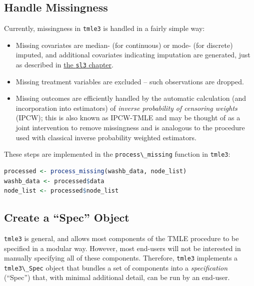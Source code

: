 \documentclass[
  12pt, krantz2,
]{book}
\newcommand{\passthrough}[1]{#1}
\providecommand{\tightlist}{%
  \setlength{\itemsep}{0pt}\setlength{\parskip}{0pt}}
\theoremstyle{definition}
\theoremstyle{definition}
\theoremstyle{definition}
\newcommand{\1}{\mathbbm{1}}
\begin{document}
\hypertarget{handle-missingness}{%
\subsection{Handle Missingness}\label{handle-missingness}}

Currently, missingness in \passthrough{\lstinline!tmle3!} is handled in a fairly simple way:

\begin{itemize}
\tightlist
\item
  Missing covariates are median- (for continuous) or mode- (for discrete)
  imputed, and additional covariates indicating imputation are generated, just
  as described in \protect\hyperlink{sl3}{the \passthrough{\lstinline!sl3!} chapter}.
\item
  Missing treatment variables are excluded -- such observations are dropped.
\item
  Missing outcomes are efficiently handled by the automatic calculation (and
  incorporation into estimators) of \emph{inverse probability of censoring weights}
  (IPCW); this is also known as IPCW-TMLE and may be thought of as a joint
  intervention to remove missingness and is analogous to the procedure used with
  classical inverse probability weighted estimators.
\end{itemize}

These steps are implemented in the \passthrough{\lstinline!process\_missing!} function in \passthrough{\lstinline!tmle3!}:

\begin{lstlisting}[language=R]
processed <- process_missing(washb_data, node_list)
washb_data <- processed$data
node_list <- processed$node_list
\end{lstlisting}

\hypertarget{create-a-spec-object}{%
\subsection{Create a ``Spec'' Object}\label{create-a-spec-object}}

\passthrough{\lstinline!tmle3!} is general, and allows most components of the TMLE procedure to be
specified in a modular way. However, most end-users will not be interested in
manually specifying all of these components. Therefore, \passthrough{\lstinline!tmle3!} implements a
\passthrough{\lstinline!tmle3\_Spec!} object that bundles a set of components into a \emph{specification}
(``Spec'') that, with minimal additional detail, can be run by an end-user.
\end{document}
